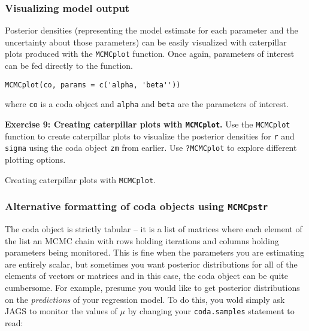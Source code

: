 \documentclass[12pt,english]{article}
\begin{document}
\subsubsection{Visualizing model output}

Posterior densities (representing the model estimate for each parameter and the uncertainty about those parameters) can be easily visualized with caterpillar plots produced with the \texttt{MCMCplot} function. Once again, parameters of interest can be fed directly to the function.

\begin{Verbatim}
MCMCplot(co, params = c('alpha, 'beta''))
\end{Verbatim}

\noindent where \texttt{co} is a coda object and \texttt{alpha} and \texttt{beta} are the parameters of interest.



\bigskip
\belowcaptionskip=-40pt
\begin{exercise}
\begin{mdframed}
\doublespacing
\textbf{Exercise 9: Creating caterpillar plots with \texttt{MCMCplot}.} Use the \texttt{MCMCplot} function to create caterpillar plots to visualize the posterior densities for \texttt{r} and \texttt{sigma} using the coda object \texttt{zm} from earlier. Use \texttt{?MCMCplot} to explore different plotting options.
\end{mdframed}
\captionsetup{textformat=empty, labelformat=empty}
\caption[Creating caterpillar plots with \texttt{MCMCplot}]{Creating caterpillar plots with \texttt{MCMCplot}.}
\label{ex:caterpillar plots MCMCplot}
\end{exercise}
\belowcaptionskip=0pt

\subsubsection{Alternative formatting of coda objects using \texttt{MCMCpstr}}

The coda object is strictly tabular -- it is a list of matrices where each element of the list an MCMC chain with rows holding iterations and columns holding parameters being monitored. This is fine when the parameters you are estimating are entirely scalar, but sometimes you want posterior distributions for all of the elements of vectors or matrices and in this case, the coda object can be quite cumbersome. For example, presume you would like to get posterior distributions on the \emph{predictions} of your regression model. To do this, you wold simply ask JAGS to monitor the values of $\mu$ by changing your \texttt{coda.samples} statement to read:
\end{document}
